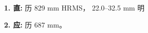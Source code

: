 \documentclass[11pt,a4paper]{article}
\numberwithin{equation}{section}
\numberwithin{figure}{section}
\begin{document}
\textbf{1. {\cjkfont 直}\allowbreak{}:} {\cjkfont 历}\allowbreak{} 829 mm HRMS{\cjkfont ，}\allowbreak{} 22.0–32.5 mm {\cjkfont 明}\allowbreak{}

\textbf{2. {\cjkfont 应}\allowbreak{}:} {\cjkfont 历}\allowbreak{} 687 mm{\cjkfont 。}\allowbreak{}
\end{document}
